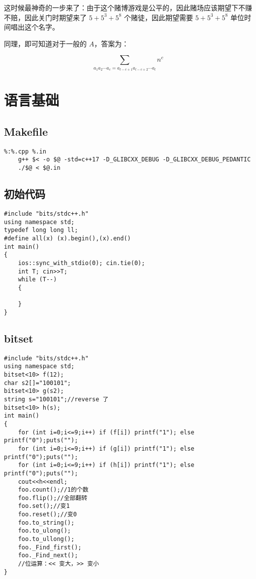 \documentclass[12pt]{ctexart}
\begin{document}
这时候最神奇的一步来了：由于这个赌博游戏是公平的，因此赌场应该期望下不赚不赔，因此关门时期望来了 $5+5^3+5^8$ 个赌徒，因此期望需要 $5+5^3+5^8$ 单位时间唱出这个名字。

同理，即可知道对于一般的 $A$，答案为：

$$\sum\limits_{a_1a_2\cdots a_c=a_{l-c+1}a_{l-c+2}\cdots a_l} n^c$$


\newpage

\section{语言基础}

\subsection{Makefile}

\begin{lstlisting}
%:%.cpp %.in
	g++ $< -o $@ -std=c++17 -D_GLIBCXX_DEBUG -D_GLIBCXX_DEBUG_PEDANTIC
	./$@ < $@.in
\end{lstlisting}
\subsection{初始代码}

\begin{lstlisting}
#include "bits/stdc++.h"
using namespace std;
typedef long long ll;
#define all(x) (x).begin(),(x).end()
int main()
{
	ios::sync_with_stdio(0); cin.tie(0);
	int T; cin>>T;
	while (T--)
	{

	}
}
\end{lstlisting}


\subsection{bitset}

\begin{lstlisting}
#include "bits/stdc++.h"
using namespace std;
bitset<10> f(12);
char s2[]="100101";
bitset<10> g(s2);
string s="100101";//reverse 了
bitset<10> h(s);
int main()
{
	for (int i=0;i<=9;i++) if (f[i]) printf("1"); else printf("0");puts("");
	for (int i=0;i<=9;i++) if (g[i]) printf("1"); else printf("0");puts("");
	for (int i=0;i<=9;i++) if (h[i]) printf("1"); else printf("0");puts("");
	cout<<h<<endl;
    foo.count();//1的个数
	foo.flip();//全部翻转
	foo.set();//变1
	foo.reset();//变0
	foo.to_string();
	foo.to_ulong();
	foo.to_ullong();
	foo._Find_first();
	foo._Find_next();
    //位运算：<< 变大，>> 变小
}
\end{lstlisting}
\end{document}
